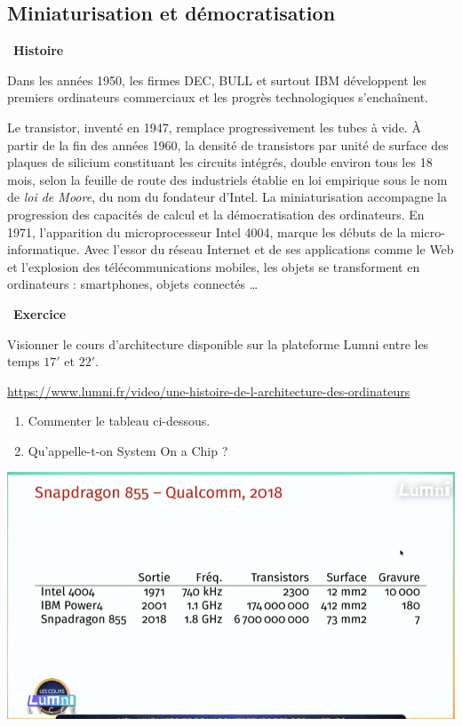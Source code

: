 \documentclass[a4paper, french, 11pt]{article}  %
\newcounter{rque}
\newcounter{cours}
\newcounter{exercice}
\newenvironment{exercice}[1]
{\par \medskip   \addtocounter{exercice}{1} \noindent  
\begin{bclogo}[arrondi =0.1,   noborder = true, logo=\bccrayon, marge=4]{~\textbf{Exercice} \textbf{\theexercice} {\itshape #1} }  \par}
{
\end{bclogo}
 \par \bigskip }
\newcounter{prog}
\newcounter{histo}
\newenvironment{histoire}[1]
{\par \medskip   \addtocounter{histo}{1} \noindent  
 \begin {bclogo}[couleur = blue!10 , arrondi =0.1,logo=\bchorloge, marge=4] {~\textbf{Histoire} \textbf{\thehisto} {\itshape #1} }  \par}
{
\end{bclogo}
 \par \bigskip }
\begin{document}
\subsection{Miniaturisation et démocratisation}

\begin{histoire}{}
Dans les années 1950, les firmes DEC, BULL et surtout IBM développent les premiers ordinateurs commerciaux et les progrès technologiques s'enchaînent. 

Le transistor, inventé en 1947, remplace progressivement les tubes à vide. À partir de la fin des années 1960, la densité de transistors par unité de surface des plaques de silicium constituant les circuits intégrés, double environ tous les 18 mois, selon la feuille de route des industriels établie en loi empirique sous le nom de \textit{loi de Moore}, du nom du fondateur d'Intel. La miniaturisation accompagne la progression des capacités de calcul et la démocratisation des ordinateurs. En 1971, l'apparition du microprocesseur Intel 4004, marque les débuts de la micro-informatique. Avec l'essor du réseau Internet et de ses applications comme le Web et l'explosion des télécommunications mobiles, les objets se transforment en ordinateurs : smartphones, objets connectés  \ldots 
\end{histoire}

\begin{exercice}{}
Visionner le cours d'architecture disponible sur la plateforme Lumni  entre les temps $17'$ et $22'$.  


\url{https://www.lumni.fr/video/une-histoire-de-l-architecture-des-ordinateurs}


\begin{enumerate}
	\item Commenter le tableau ci-dessous.
	\item Qu'appelle-t-on System On a Chip ?
\end{enumerate}



 
\begin{center}
\includegraphics[scale=0.3]{images/miniaturisation.png}
\end{center}

\end{exercice}
\end{document}
